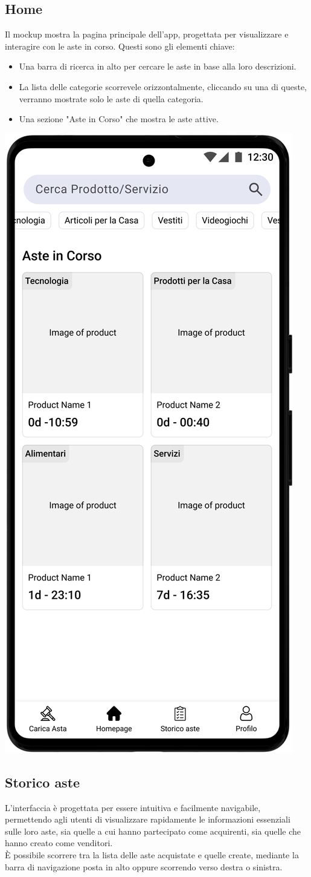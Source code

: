 \newpage
\subsection{Home}
Il mockup mostra la pagina principale dell'app, progettata per visualizzare e interagire con le aste in corso.
Questi sono gli elementi chiave:
\begin{itemize}
	\item Una barra di ricerca in alto per cercare le aste in base alla loro descrizioni.
	\item La lista delle categorie scorrevele orizzontalmente, cliccando su una di queste, verranno mostrate solo le aste di quella categoria.
	\item Una sezione "Aste in Corso" che mostra le aste attive.
\end{itemize}
\begin{center}
	\includegraphics[width=.35\textwidth]{assets/mockup/HomePage.png}
\end{center}

\newpage
\subsection{Storico aste}
L'interfaccia è progettata per essere intuitiva e facilmente navigabile, permettendo agli utenti di visualizzare rapidamente le informazioni essenziali sulle loro aste, sia quelle a cui hanno partecipato come acquirenti, sia quelle che hanno creato come venditori.\\
È possibile scorrere tra la lista delle aste acquistate e quelle create, mediante la barra di navigazione posta in alto oppure scorrendo verso destra o sinistra.


